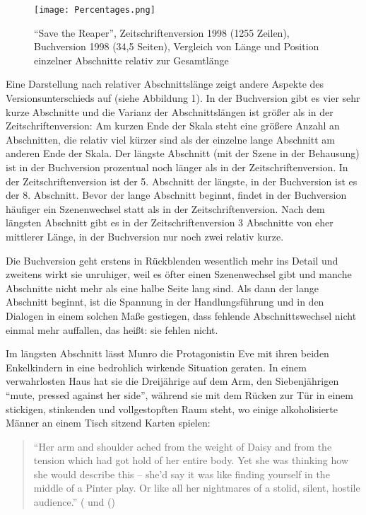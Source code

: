 \documentclass[fontsize=12pt]{scrartcl}
\begin{document}
\begin{figure}
\texttt{[image: Percentages.png]}
\caption{\small{"`Save the Reaper"', Zeitschriftenversion 1998 (1255 Zeilen), Buchversion 1998 (34,5 Seiten), Vergleich von L\"ange und Position einzelner Abschnitte relativ zur Gesamtl\"ange}}
\label{fig:1}
\end{figure}

Eine Darstellung nach relativer Abschnittsl\"ange zeigt andere Aspekte des Ver\-sions\-un\-ter\-schieds auf (siehe Abbildung 1). In der Buchversion gibt es \mbox{vier} sehr kurze Abschnitte und die Varianz der Abschnittsl\"angen ist gr\"o{\ss}er als in der Zeitschriftenversion: Am kurzen Ende der Skala steht eine gr\"o{\ss}ere Anzahl an Abschnitten, die relativ viel k\"urzer sind als der einzelne lange Abschnitt am anderen Ende der Skala. Der l\"angste Abschnitt (mit der Szene in der Behausung) ist in der Buchversion prozentual noch l\"anger als in der Zeitschriftenversion. In der Zeitschriftenversion ist der 5. Abschnitt der l\"angste, in der Buchversion ist es der 8. Abschnitt. Bevor der lange Abschnitt beginnt, findet in der Buchversion h\"aufiger ein Szenenwechsel statt als in der Zeitschriftenversion. Nach dem l\"angsten Abschnitt gibt es in der Zeitschriftenversion 3 Abschnitte von eher mittlerer L\"ange, in der Buchversion nur noch zwei relativ kurze.

Die Buchversion geht erstens in R\"uckblenden we\-sent\-lich mehr ins Detail und zwei\-tens wirkt sie unruhiger, weil es \"ofter einen Szenenwechsel gibt und manche Abschnitte nicht mehr als eine halbe Seite lang sind. Als dann der lange Abschnitt beginnt, ist die Spannung in der Handlungsf\"uh\-rung und in den Dialogen in einem solchen Ma{\ss}e gestiegen, dass fehlende Abschnittswechsel nicht einmal mehr auf\-fal\-len, das hei{\ss}t: sie fehlen nicht.

Im l\"angsten Abschnitt l\"asst Munro die Protagonistin\textsuperscript{\tiny *} Eve mit ihren beiden Enkelkin\-dern in eine bedrohlich wirkende Situation geraten. In einem verwahrlosten Haus hat sie die Dreij\"ahrige auf dem Arm, den Siebenj\"ahrigen "`mute, pressed against her side"', w\"ahrend sie mit dem R\"ucken zur T\"ur in einem stickigen, stinkenden und vollgestopften Raum steht, wo einige alkoholisierte M\"anner an einem Tisch sitzend Karten spielen: 

\singlespacing
\begin{quote}
"`Her arm and shoulder ached from the weight of Daisy and from the tension which had got hold of her entire body. Yet she was thinking how she would describe this -- she'd say it was like finding yourself in the middle of a Pinter play. Or like all her nightmares of a stolid, silent, hostile audience."' (\cite{Munro1998B} und (\cite{Munro1998Z})
\end{quote}
\onehalfspacing
\end{document}
